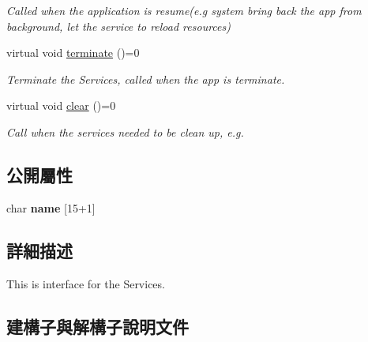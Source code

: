 \begin{DoxyCompactItemize}
\begin{DoxyCompactList}\small\item\em Called when the application is resume(e.\+g system bring back the app from background, let the service to reload resources) \end{DoxyCompactList}\item 
virtual void \hyperlink{class_i_dream_sky_1_1_i_service_aa47175d5b9d49b19ee55ad7901e06835}{terminate} ()=0\hypertarget{class_i_dream_sky_1_1_i_service_aa47175d5b9d49b19ee55ad7901e06835}{}\label{class_i_dream_sky_1_1_i_service_aa47175d5b9d49b19ee55ad7901e06835}

\begin{DoxyCompactList}\small\item\em Terminate the Services, called when the app is terminate. \end{DoxyCompactList}\item 
virtual void \hyperlink{class_i_dream_sky_1_1_i_service_a7fff17de63ba695cdfaf2e942f85dd51}{clear} ()=0
\begin{DoxyCompactList}\small\item\em Call when the services needed to be clean up, e.\+g. \end{DoxyCompactList}\end{DoxyCompactItemize}
\subsection*{公開屬性}
\begin{DoxyCompactItemize}
\item 
char {\bfseries name} \mbox{[}15+1\mbox{]}\hypertarget{class_i_dream_sky_1_1_i_service_a5604ee4bc11c2e9c2f9170d377824a0f}{}\label{class_i_dream_sky_1_1_i_service_a5604ee4bc11c2e9c2f9170d377824a0f}

\end{DoxyCompactItemize}


\subsection{詳細描述}
This is interface for the Services. 

\subsection{建構子與解構子說明文件}

